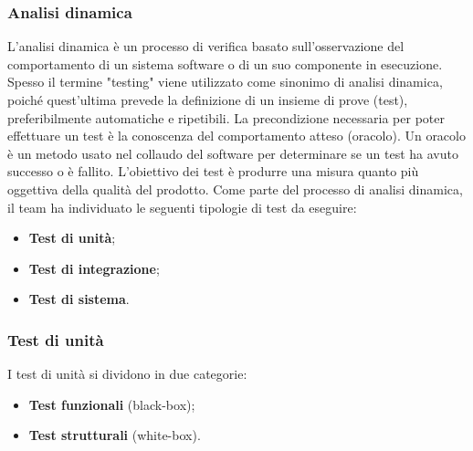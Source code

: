 \subsubsection{Analisi dinamica}
\par L’analisi dinamica è un processo di verifica basato sull’osservazione del comportamento di un sistema software o di un suo componente in esecuzione. Spesso il termine "testing" viene utilizzato come sinonimo di analisi dinamica, poiché quest’ultima prevede la definizione di un insieme di prove (test), preferibilmente automatiche e ripetibili. La precondizione necessaria per poter effettuare un test è la conoscenza del comportamento atteso (oracolo). Un oracolo è un metodo usato nel collaudo del software per determinare se un test ha avuto successo o è fallito. L’obiettivo dei test è produrre una misura quanto più oggettiva della qualità del prodotto. Come parte del processo di analisi dinamica, il team ha individuato le seguenti tipologie di test da eseguire:
\begin{itemize}
  \item \textbf{Test di unità};
  \item \textbf{Test di integrazione};
  \item \textbf{Test di sistema}.
\end{itemize}

\subsubsection{Test di unità}
\par I test di unità si dividono in due categorie:
\begin{itemize}
  \item \textbf{Test funzionali} (black-box);
  \item \textbf{Test strutturali} (white-box).
\end{itemize}
